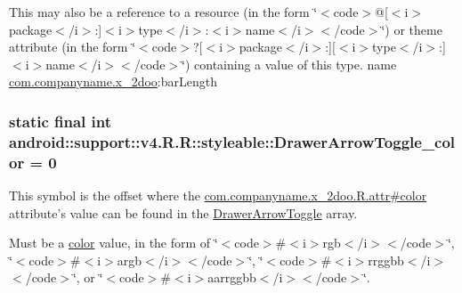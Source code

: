 This may also be a reference to a resource (in the form \char`\"{}$<$code$>$@\mbox{[}$<$i$>$package$<$/i$>$:\mbox{]}$<$i$>$type$<$/i$>$:$<$i$>$name$<$/i$>$$<$/code$>$\char`\"{}) or theme attribute (in the form \char`\"{}$<$code$>$?\mbox{[}$<$i$>$package$<$/i$>$:\mbox{]}\mbox{[}$<$i$>$type$<$/i$>$:\mbox{]}$<$i$>$name$<$/i$>$$<$/code$>$\char`\"{}) containing a value of this type.  name \hyperlink{namespacecom_1_1companyname_1_1x__2doo}{com.companyname.x\_\-2doo}:barLength \hypertarget{classandroid_1_1support_1_1v4_1_1_r_1_1styleable_a1f61b1d9facd68b52706ef636cd8da9}{
\subsubsection[{DrawerArrowToggle\_\-color}]{\setlength{\rightskip}{0pt plus 5cm}static final int android::support::v4.R.R::styleable::DrawerArrowToggle\_\-color = 0}}
\label{classandroid_1_1support_1_1v4_1_1_r_1_1styleable_a1f61b1d9facd68b52706ef636cd8da9}


This symbol is the offset where the \hyperlink{classcom_1_1companyname_1_1x__2doo_1_1_r_1_1attr_3443d23802638e3da0e24ccb5744ca55}{com.companyname.x\_\-2doo.R.attr\#color} attribute's value can be found in the \hyperlink{classandroid_1_1support_1_1v4_1_1_r_1_1styleable_df2952a999161d3c408fb6267800afe6}{DrawerArrowToggle} array.

Must be a \hyperlink{classandroid_1_1support_1_1v4_1_1_r_1_1color}{color} value, in the form of \char`\"{}$<$code$>$\#$<$i$>$rgb$<$/i$>$$<$/code$>$\char`\"{}, \char`\"{}$<$code$>$\#$<$i$>$argb$<$/i$>$$<$/code$>$\char`\"{}, \char`\"{}$<$code$>$\#$<$i$>$rrggbb$<$/i$>$$<$/code$>$\char`\"{}, or \char`\"{}$<$code$>$\#$<$i$>$aarrggbb$<$/i$>$$<$/code$>$\char`\"{}. 

